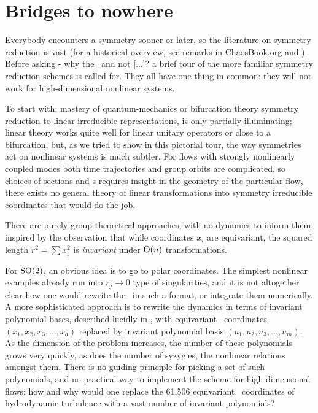 \documentclass[aip,cha,reprint,
secnumarabic,
nofootinbib, tightenlines,
nobibnotes, showkeys, showpacs,
groupedaddress
]{revtex4-1}
\begin{document}
\section{Bridges to nowhere}
\label{s:bridge}

Everybody encounters a symmetry sooner or later, so the literature on
symmetry reduction is vast (for a historical overview, see remarks in
ChaosBook.org and ). Before asking - why the \mslices\
and not [...]? a brief tour of the more familiar symmetry reduction
schemes is called for. They all have one thing in common: they will not
work for high-dimensional nonlinear systems.

To start with: mastery of quantum-mechanics or bifurcation
theory symmetry reduction to linear irreducible
representations,\rf{PCgr} is only partially illuminating; linear theory
works quite well for linear unitary operators or close to a bifurcation,
but, as we tried to show in this pictorial tour, the way symmetries act
on nonlinear systems is much subtler. For flows with strongly nonlinearly
coupled modes both time trajectories and  group orbits are complicated,
so choices of sections and \slice s requires insight in the geometry of
the particular flow, there exists no general theory of linear
transformations into symmetry irreducible coordinates that would do the
job.

There are purely group-theoretical approaches, with no dynamics to inform
them, inspired by the observation that while coordinates $x_i$ are
equivariant, the squared length $r^2 = \sum x_i^2$ is \emph{invariant}
under $\textrm{O}(n)$ transformations.

For $\textrm{SO}(2)$, an obvious idea is to go to polar coordinates. The
simplest nonlinear examples\rf{AGHO288} already run into $r_j \to 0$ type
of singularities, and it is not altogether clear how one would rewrite
the \NSe\ in such a format, or integrate them numerically. A more
sophisticated  approach is to rewrite the dynamics in terms of
invariant polynomial bases, described lucidly in , with
equivariant \statesp\ coordinates $(x_1,x_2,x_3,...,x_d)$ replaced by
invariant polynomial basis $(u_1,u_2,u_3,...,u_m)$. As the dimension of
the problem increases, the number of these polynomials grows very
quickly, as does the number of syzygies, the nonlinear relations amongst
them. There is no guiding principle for picking a set of such
polynomials, and no practical way to implement the
scheme for high-dimensional flows: how and why would one
replace the 61,506 equivariant \statesp\ coordinates of hydrodynamic
turbulence with a vast number of invariant polynomials?
\end{document}
